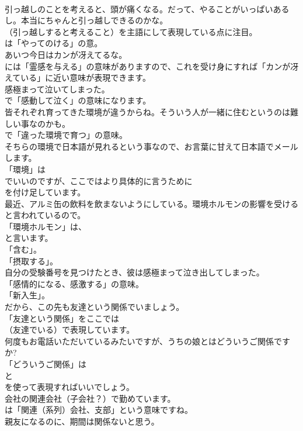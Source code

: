 \documentclass[8pt]{extreport}
\begin{document}
\begin{CJK}{UTF8}{min}
\\	引っ越しのことを考えると、頭が痛くなる。だって、やることがいっぱいあるし。本当にちゃんと引っ越しできるのかな。 
\\	（引っ越しすると考えること）を主語にして表現している点に注目。
\\	は「やってのける」の意。	
\\	あいつ今日はカンが冴えてるな。 
\\	には「霊感を与える」の意味がありますので、これを受け身にすれば「カンが冴えている」に近い意味が表現できます。	
\\	感極まって泣いてしまった。 
\\	で「感動して泣く」の意味になります。	
\\	皆それぞれ育ってきた環境が違うからね。そういう人が一緒に住むというのは難しい事なのかも。 
\\	で「違った環境で育つ」の意味。	
\\	そちらの環境で日本語が見れるという事なので、お言葉に甘えて日本語でメールします。 
\\	「環境」は
\\	でいいのですが、ここではより具体的に言うために
\\	を付け足しています。	
\\	最近、アルミ缶の飲料を飲まないようにしている。環境ホルモンの影響を受けると言われているので。 
\\	「環境ホルモン」は、
\\	と言います。
\\	「含む」。
\\	「摂取する」。	
\\	自分の受験番号を見つけたとき、彼は感極まって泣き出してしまった。 
\\	「感情的になる、感激する」の意味。
\\	「新入生」。	
\\	だから、この先も友達という関係でいましょう。 
\\	「友達という関係」をここでは
\\	（友達でいる）で表現しています。	
\\	何度もお電話いただいているみたいですが、うちの娘とはどういうご関係ですか? 
\\	「どういうご関係」は 
\\	と 
\\	を使って表現すればいいでしょう。	
\\	会社の関連会社（子会社？）で勤めています。 
\\	は「関連（系列）会社、支部」という意味ですね。	
\\	親友になるのに、期間は関係ないと思う。 

\end{CJK}
\end{document}
